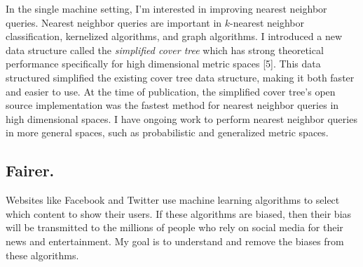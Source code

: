 \documentclass[12pt]{article}
\begin{document}
In the single machine setting,
I'm interested in improving nearest neighbor queries.
Nearest neighbor queries are important in $k$-nearest neighbor classification, kernelized algorithms, and graph algorithms.
I introduced a new data structure called the \emph{simplified cover tree} which has strong theoretical performance specifically for high dimensional metric spaces [5].
This data structured simplified the existing cover tree data structure, 
making it both faster and easier to use.
At the time of publication, the simplified cover tree's open source implementation was the fastest method for nearest neighbor queries in high dimensional spaces.
I have ongoing work to perform nearest neighbor queries in more general spaces,
such as probabilistic and generalized metric spaces.


\vspace{-0.15in}
\subsection*{Fairer.}

Websites like Facebook and Twitter use machine learning algorithms to select which content to show their users.
If these algorithms are biased,
then their bias will be transmitted to the millions of people who rely on social media for their news and entertainment.
My goal is to understand and remove the biases from these algorithms.
\end{document}
